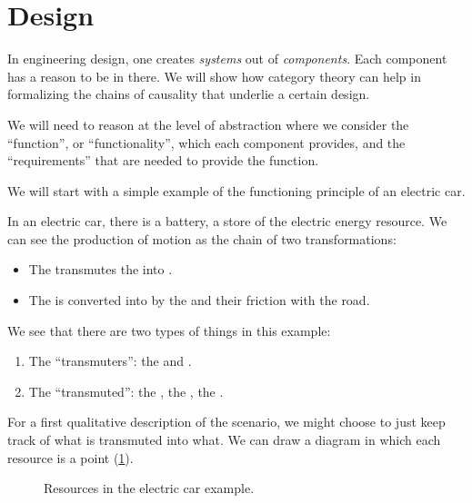 

\section{Design}
\label{sec:dependencies-design}




In engineering design, one creates \emph{systems} out of \emph{components}. Each component has a reason to be in there. We will show how category theory can help in formalizing the chains of causality that underlie a certain design.

We will need to reason at the level of abstraction where we consider the ``function'', or ``functionality'', which each component provides, and the ``requirements'' that are needed to provide the function.

We will start with a simple example of the functioning principle of an electric car.

In an electric car, there is a battery, a store of the electric energy resource. We can see the production of motion as the chain of two transformations:

\begin{itemize}
    \item The \motor transmutes the \electricpower into \rotationalmotion.
    \item The \rotationalmotion is converted into \translationalmotion by the \wheels and their friction with the road.
\end{itemize}

We see that there are two types of things in this example:
\begin{enumerate}
    \item The ``transmuters'': the \motor and \wheels.
    \item The ``transmuted'': the \electricpower, the \rotationalmotion, the \translationalmotion.
\end{enumerate}

For a first qualitative description of the scenario, we might choose to just keep track of what is transmuted into what. We can draw a diagram in which each resource is a point (\cref{fig:e1}).

\begin{figure}[h!]
    \centering
    \caption{Resources in the electric car example.}
    \label{fig:e1}
\end{figure}


